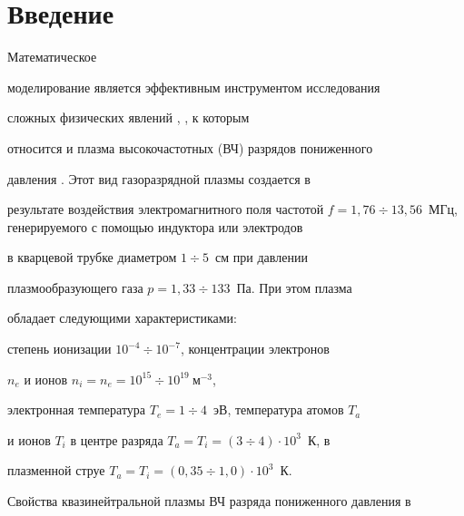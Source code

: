 \pagestyle{plain} %







\maketitle


\label{begin}








\section{Введение}





Математическое


моделирование является эффективным инструментом исследования


сложных физических явлений \cite{Sam1}, \cite{SamMikh}, к которым


относится и плазма высокочастотных (ВЧ) разрядов пониженного


давления \cite{my_book}. Этот вид газоразрядной плазмы создается в


результате воздействия электромагнитного поля частотой $f=1{,}76


\div 13{,}56$~МГц, генерируемого с помощью индуктора или электродов


в кварцевой трубке диаметром $1 \div 5$~см при давлении


плазмообразующего газа $p=1{,}33 \div 133$~Па. При этом плазма


обладает следующими характеристиками:


степень ионизации $10^{-4}\div10^{-7}$, концентрации электронов


$n_e$ и ионов $n_i=n_e=10^{15}\div10^{19}~м{}^{-3}$,


электронная температура $T_e=1\div 4$~эВ, температура атомов $T_a$


и ионов $T_i$ в центре разряда $T_a=T_i=(3\div 4)\cdot 10^3$~К, в


плазменной струе $T_a=T_i=(0{,}35\div 1{,}0)\cdot 10^3$~К.





Свойства квазинейтральной плазмы ВЧ разряда пониженного давления в


